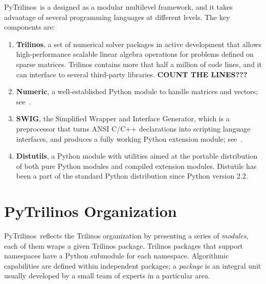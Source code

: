 \documentclass[10pt,relax]{SANDreport}
\newcommand{\PyTrilinos}{{PyTrilinos}}
\begin{document}
\PyTrilinos\ is a designed as a modular multilevel framework, and it
takes advantage of several programming languages at different levels.
The key components are:
\begin{enumerate}

\item {\bf Trilinos}, a set of numerical solver packages in active
  development that allows high-performance scalable linear algebra
  operations for problems defined on sparse matrices. Trilinos
  contains more that half a million of code lines, and it can
  interface to several third-party libraries.  {\bf COUNT THE
    LINES???}

\item {\bf Numeric}, a well-established Python module to handle
  matrices and vectors; see~\cite{numeric}.

\item {\bf SWIG}, the Simplified Wrapper and Interface Generator,
  which is a preprocessor that turns ANSI C/C++ declarations into
  scripting language interfaces, and produces a fully working Python
  extension module; see~\cite{swig}.

\item {\bf Distutils}, a Python module with utilities aimed at the
  portable distribution of both pure Python modules and compiled
  extension modules.  Distutils has been a part of the standard Python
  distribution since Python version 2.2.

\end{enumerate}

\section{PyTrilinos Organization}
\label{sec:organization}

\PyTrilinos\ reflects the Trilinos organization by presenting a series
of {\sl modules}, each of them wraps a given Trilinos package.
Trilinos packages that support namespaces have a Python submodule for
each namespace.  Algorithmic capabilities are defined within
independent packages; a {\sl package} is an integral unit usually
developed by a small team of experts in a particular area.
\end{document}
